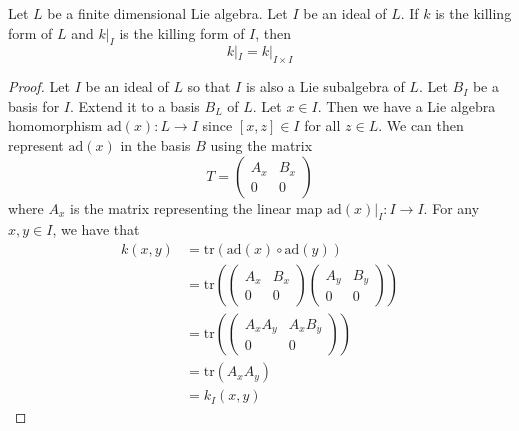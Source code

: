\documentclass[a4paper]{article}
\begin{document}
\begin{lmm}{}{} Let $L$ be a finite dimensional Lie algebra. Let $I$ be an ideal of $L$. If $k$ is the killing form of $L$ and $k|_I$ is the killing form of $I$, then $$k|_I=k|_{I\times I}$$ \tcbline
\begin{proof}
Let $I$ be an ideal of $L$ so that $I$ is also a Lie subalgebra of $L$. Let $B_I$ be a basis for $I$. Extend it to a basis $B_L$ of $L$. Let $x\in I$. Then we have a Lie algebra homomorphism $\text{ad}(x):L\to I$ since $[x,z]\in I$ for all $z\in L$. We can then represent $\text{ad}(x)$ in the basis $B$ using the matrix $$T=\begin{pmatrix}
A_x & B_x\\
0 & 0
\end{pmatrix}$$ where $A_x$ is the matrix representing the linear map $\text{ad}(x)|_I:I\to I$. For any $x,y\in I$, we have that 
\begin{align*}
k(x,y)&=\text{tr}(\text{ad}(x)\circ\text{ad}(y))\\
&=\text{tr}\left(\begin{pmatrix}
A_x & B_x\\
0 & 0
\end{pmatrix}\begin{pmatrix}
A_y & B_y\\
0 & 0
\end{pmatrix}\right)\\
&=\text{tr}\left(\begin{pmatrix}
A_xA_y & A_xB_y\\
0 & 0
\end{pmatrix}\right)\\
&=\text{tr}(A_xA_y)\\
&=k_I(x,y)
\end{align*}
\end{proof}
\end{lmm}
\end{document}
